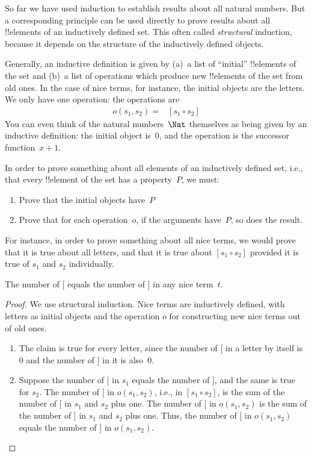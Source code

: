 \documentclass[../../../include/open-logic-section]{subfiles}
\begin{document}

So far we have used induction to establish results about all natural
numbers. But a corresponding principle can be used directly to prove
results about all !!{element}s of an inductively defined set.  This
often called \emph{structural} induction, because it depends on the
structure of the inductively defined objects.

Generally, an inductive definition is given by (a)~a list of
``initial'' !!{element}s of the set and (b)~a list of operations which
produce new !!{element}s of the set from old ones. In the case of nice
terms, for instance, the initial objects are the letters. We only have
one operation: the operations are
\begin{align*}
  o(s_1, s_2) = & [s_1 \circ s_2]
\end{align*}
You can even think of the natural numbers~$\Nat$ themselves as being
given by an inductive definition: the initial object is~$0$, and the
operation is the successor function~$x + 1$.

In order to prove something about all elements of an inductively
defined set, i.e., that every !!{element} of the set has a
property~$P$, we must:
\begin{enumerate}
\item Prove that the initial objects have~$P$
\item Prove that for each operation~$o$, if the arguments have~$P$,
  so does the result.
\end{enumerate}
For instance, in order to prove something about all nice terms, we
would prove that it is true about all letters, and that it is true
about $[s_1 \circ s_2]$ provided it is true of $s_1$ and $s_2$
individually.

\begin{prop}
  The number of $[$ equals the number of $]$ in any nice term~$t$.
\end{prop}

\begin{proof}
We use structural induction.  Nice terms are inductively defined, with
letters as initial objects and the operation $o$ for constructing new
nice terms out of old ones.
\begin{enumerate}
\item The claim is true for every letter, since the number of $[$ in a
  letter by itself is~$0$ and the number of $]$ in it is also~$0$.
\item Suppose the number of $[$ in $s_1$ equals the number of $]$, and
  the same is true for $s_2$. The number of $[$ in $o(s_1, s_2)$, i.e., in
    $[s_1 \circ s_2]$, is the sum of the number of $[$ in $s_1$ and
      $s_2$ plus one. The number of $]$ in $o(s_1, s_2)$ is the sum of the number
    of $]$ in $s_1$ and $s_2$ plus one. Thus, the number of $[$ in $o(s_1, s_2)$
    equals the number of $]$ in $o(s_1,s_2)$.
\end{enumerate}
\end{proof}
\end{document}

